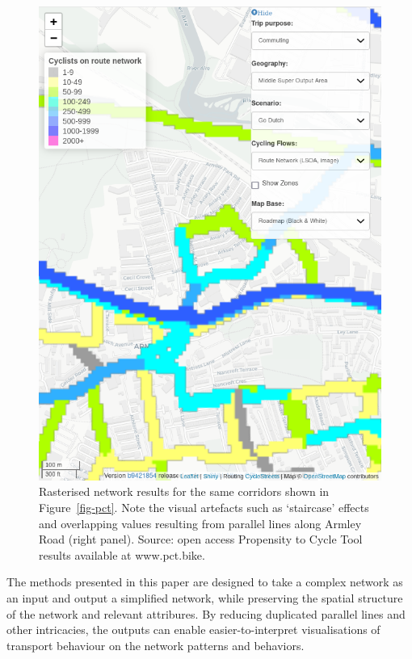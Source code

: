 \documentclass[
  letterpaper,
  DIV=11,
  numbers=noendperiod]{scrartcl}
\begin{document}
\begin{figure}
\begin{minipage}[t]{0.50\linewidth}
{{\includegraphics{images/armley-road-raster.png}

}

}

\subcaption{\label{fig-armley-road-raster}}
\end{minipage}%

\caption{\label{fig-rasterisation}Rasterised network results for the
same corridors shown in Figure~\ref{fig-pct}. Note the visual artefacts
such as `staircase' effects and overlapping values resulting from
parallel lines along Armley Road (right panel). Source: open access
Propensity to Cycle Tool results available at www.pct.bike.}

\end{figure}

The methods presented in this paper are designed to take a complex
network as an input and output a simplified network, while preserving
the spatial structure of the network and relevant attribures. By
reducing duplicated parallel lines and other intricacies, the outputs
can enable easier-to-interpret visualisations of transport behaviour on
the network patterns and behaviors.
\end{document}
